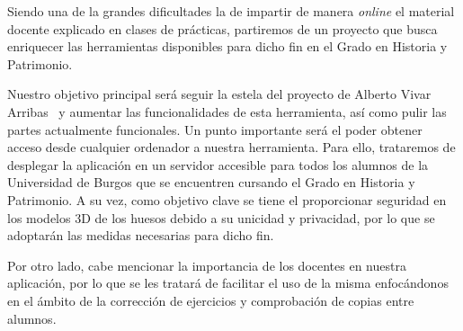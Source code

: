 
Siendo una de la grandes dificultades la de impartir de manera \textit{online} el material docente explicado en clases de prácticas, partiremos de un proyecto que busca enriquecer las herramientas disponibles para dicho fin en el Grado en Historia y Patrimonio.

Nuestro objetivo principal será seguir la estela del proyecto de Alberto Vivar Arribas~\cite{github:alberto-viewer} y aumentar las funcionalidades de esta herramienta, así como pulir las partes actualmente funcionales. Un punto importante será el poder obtener acceso desde cualquier ordenador a nuestra herramienta. Para ello, trataremos de desplegar la aplicación en un servidor accesible para todos los alumnos de la Universidad de Burgos que se encuentren cursando el Grado en Historia y Patrimonio. A su vez, como objetivo clave se tiene el proporcionar seguridad en los modelos 3D de los huesos debido a su unicidad y privacidad, por lo que se adoptarán las medidas necesarias para dicho fin.

Por otro lado, cabe mencionar la importancia de los docentes en nuestra aplicación, por lo que se les tratará de facilitar el uso de la misma enfocándonos en el ámbito de la corrección de ejercicios y comprobación de copias entre alumnos.
